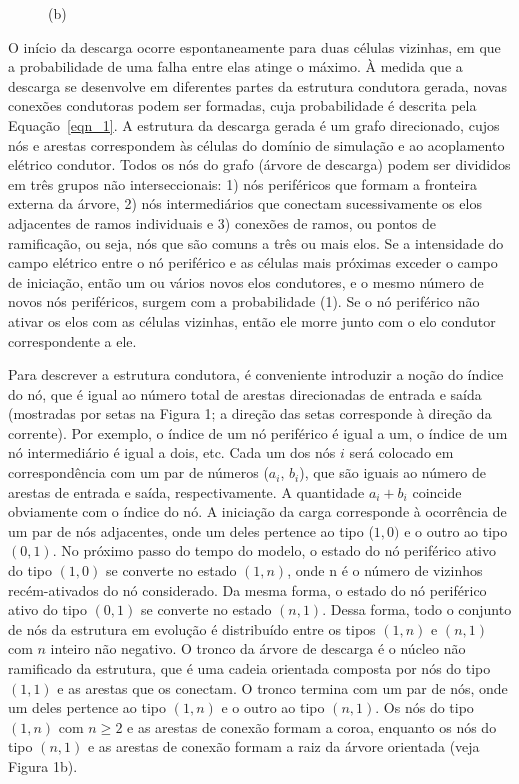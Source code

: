 \documentclass[a4paper, 12pt, onecolumn,singlespacing]{article}
\begin{document}
\begin{figure}
\begin{minipage}{0.5\textwidth}
			(b)
		\end{minipage}
		 \label{fig:componente_m}
	\end{figure}

	O início da descarga ocorre espontaneamente para duas células vizinhas, em que a probabilidade de uma falha entre elas atinge o máximo. À medida que a descarga se desenvolve em diferentes partes da estrutura condutora gerada, novas conexões condutoras podem ser formadas, cuja probabilidade é descrita pela Equação~\ref{eqn_1}. A estrutura da descarga gerada é um grafo direcionado, cujos nós e arestas correspondem às células do domínio de simulação e ao acoplamento elétrico condutor. Todos os nós do grafo (árvore de descarga) podem ser divididos em três grupos não interseccionais: 1) nós periféricos que formam a fronteira externa da árvore, 2) nós intermediários que conectam sucessivamente os elos adjacentes de ramos individuais e 3) conexões de ramos, ou pontos de ramificação, ou seja, nós que são comuns a três ou mais elos. Se a intensidade do campo elétrico entre o nó periférico e as células mais próximas exceder o campo de iniciação, então um ou vários novos elos condutores, e o mesmo número de novos nós periféricos, surgem com a probabilidade (1). Se o nó periférico não ativar os elos com as células vizinhas, então ele morre junto com o elo condutor correspondente a ele.
	
	Para descrever a estrutura condutora, é conveniente introduzir a noção do índice do nó, que é igual ao número total de arestas direcionadas de entrada e saída (mostradas por setas na Figura 1; a direção das setas corresponde à direção da corrente). Por exemplo, o índice de um nó periférico é igual a um, o índice de um nó intermediário é igual a dois, etc. Cada um dos nós $i$ será colocado em correspondência com um par de números ($a_i$, $b_i$), que são iguais ao número de arestas de entrada e saída, respectivamente. A quantidade $a_i + b_i$ coincide obviamente com o índice do nó. A iniciação da carga corresponde à ocorrência de um par de nós adjacentes, onde um deles pertence ao tipo ($1, 0)$ e o outro ao tipo $(0, 1)$. No próximo passo do tempo do modelo, o estado do nó periférico ativo do tipo $(1, 0)$ se converte no estado $(1, n)$, onde n é o número de vizinhos recém-ativados do nó considerado. Da mesma forma, o estado do nó periférico ativo do tipo $(0, 1)$ se converte no estado $(n, 1)$. Dessa forma, todo o conjunto de nós da estrutura em evolução é distribuído entre os tipos $(1, n)$ e $(n, 1)$ com $n$ inteiro não negativo. O tronco da árvore de descarga é o núcleo não ramificado da estrutura, que é uma cadeia orientada composta por nós do tipo $(1, 1)$ e as arestas que os conectam. O tronco termina com um par de nós, onde um deles pertence ao tipo $(1, n)$ e o outro ao tipo $(n, 1)$. Os nós do tipo $(1, n)$ com $n \ge 2$ e as arestas de conexão formam a coroa, enquanto os nós do tipo $(n, 1)$ e as arestas de conexão formam a raiz da árvore orientada (veja Figura 1b).
	
\end{document}
